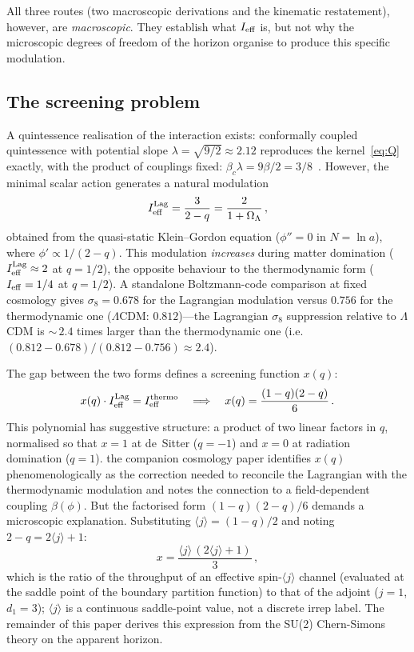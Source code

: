 \documentclass[aps,prd,twocolumn,10pt,superscriptaddress,nofootinbib]{revtex4-2}
\begin{document}
All three routes (two macroscopic derivations and the kinematic restatement), however, are \emph{macroscopic}.  They
establish what $I_{\rm eff}$ is, but not why the microscopic
degrees of freedom of the horizon organise to produce this
specific modulation.

\subsection{The screening problem}
\label{sec:screening_problem}

A quintessence realisation of the interaction exists: conformally
coupled quintessence with potential slope
$\lambda = \sqrt{9/2} \approx 2.12$ reproduces the kernel~\eqref{eq:Q}
exactly, with the product of couplings fixed:
$\beta_c\lambda = 9\beta/2 = 3/8$~\cite{Sayegh2026}.  However,
the minimal scalar action generates a natural modulation
\begin{equation}
I_{\rm eff}^{\rm Lag} = \frac{3}{2-q}
  = \frac{2}{1+\Omega_\Lambda}\,,
\label{eq:Ieff_lag}
\end{equation}
obtained from the quasi-static Klein--Gordon equation
($\phi'' = 0$ in $N = \ln a$), where $\phi' \propto 1/(2-q)$.
This modulation \emph{increases} during matter domination
($I_{\rm eff}^{\rm Lag} \approx 2$ at $q = 1/2$), the opposite
behaviour to the thermodynamic form ($I_{\rm eff} = 1/4$ at
$q = 1/2$).  A standalone Boltzmann-code comparison at fixed
cosmology gives $\sigma_8 = 0.678$ for the Lagrangian modulation
versus $0.756$ for the thermodynamic one
($\Lambda$CDM: $0.812$)---the Lagrangian $\sigma_8$ suppression
relative to $\Lambda$CDM is ${\sim}\,2.4$ times larger than the
thermodynamic one (i.e.\
$(0.812-0.678)/(0.812-0.756) \approx 2.4$).

The gap between the two forms defines a screening function $x(q)$:
\begin{equation}
x(q) \cdot I_{\rm eff}^{\rm Lag} = I_{\rm eff}^{\rm thermo}
\quad\Longrightarrow\quad
x(q) = \frac{(1-q)(2-q)}{6}\,.
\label{eq:x_def}
\end{equation}
This polynomial has suggestive structure: a product of two linear
factors in $q$, normalised so that $x = 1$ at de~Sitter ($q = -1$)
and $x = 0$ at radiation domination ($q = 1$).  the companion cosmology paper identifies
$x(q)$ phenomenologically as the correction needed to reconcile the
Lagrangian with the thermodynamic modulation and notes the connection
to a field-dependent coupling $\beta(\phi)$.  But the factorised
form $(1-q)(2-q)/6$ demands a microscopic explanation.  Substituting
$\langle j \rangle = (1-q)/2$ and noting $2 - q = 2\langle j \rangle + 1$:
\begin{equation}
x = \frac{\langle j\rangle\,(2\langle j\rangle + 1)}{3}\,,
\label{eq:x_spin_preview}
\end{equation}
which is the ratio of the throughput of an effective
spin-$\langle j\rangle$ channel (evaluated at the saddle point of
the boundary partition function) to that of the adjoint
($j = 1$, $d_1 = 3$); $\langle j \rangle$ is a continuous
saddle-point value, not a discrete irrep label.
The remainder of this paper derives this expression from the
SU(2) Chern-Simons theory on the apparent horizon.
\end{document}
